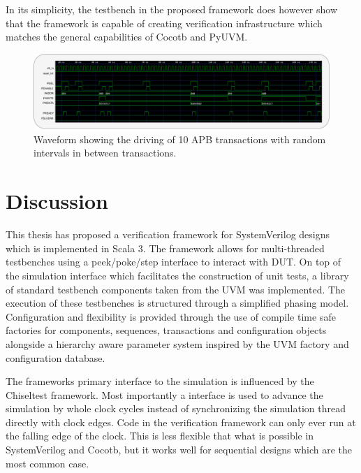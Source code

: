 In its simplicity, the testbench in the proposed framework does however show that the framework is capable of creating verification infrastructure which matches the general capabilities of Cocotb and PyUVM.
\begin{figure}[t]
  \centering
  \includegraphics[width=\textwidth]{diagrams/apb_timing.pdf}
  \caption{Waveform showing the driving of 10 APB transactions with random intervals in between transactions.}
  \label{fig:apb_timing}
\end{figure}


\chapter{Discussion} %

This thesis has proposed a verification framework for SystemVerilog designs which is implemented in Scala 3. The framework allows for multi-threaded testbenches using a peek/poke/step interface to interact with DUT. On top of the simulation interface which facilitates the construction of unit tests, a library of standard testbench components taken from the UVM was implemented. The execution of these testbenches is structured through a simplified phasing model. Configuration and flexibility is provided through the use of compile time safe factories for components, sequences, transactions and configuration objects alongside a hierarchy aware parameter system inspired by the UVM factory and configuration database.


The frameworks primary interface to the simulation is influenced by the Chiseltest framework. Most importantly a  interface is used to advance the simulation by whole clock cycles instead of synchronizing the simulation thread directly with clock edges. Code in the verification framework can only ever run at the falling edge of the clock. This is less flexible that what is possible in SystemVerilog and Cocotb, but it works well for sequential designs which are the most common case. 

